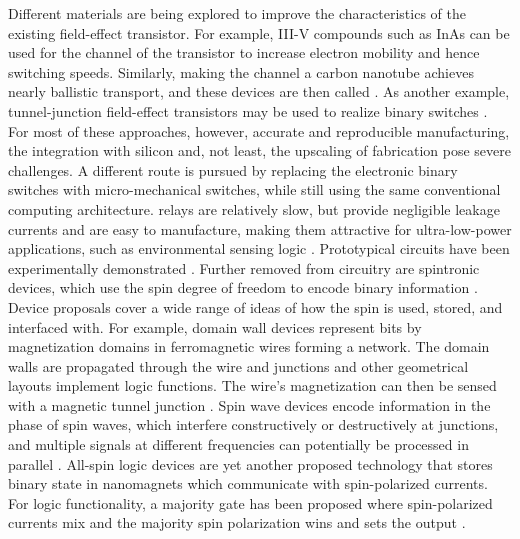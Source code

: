 Different materials are being explored to improve the characteristics of the
existing field-effect transistor. For example, III-V compounds such as InAs can
be used for the channel of the transistor to increase electron mobility and
hence switching speeds. Similarly, making the channel a carbon nanotube achieves
nearly ballistic transport, and these devices are then called .
As another example, tunnel-junction field-effect transistors may be used to
realize binary switches \cite{nikonov2013overview, cavin2012science}. For
most of these approaches, however, accurate and reproducible manufacturing, the
integration with silicon and, not least, the upscaling of fabrication pose
severe challenges. A different route is pursued by replacing the electronic
binary switches with micro-mechanical switches, while still using the same
conventional computing architecture.  relays are relatively slow, but
provide negligible leakage currents and are easy to manufacture, making them
attractive for ultra-low-power applications, such as environmental sensing logic
\cite{kam2011design}. Prototypical  circuits have been experimentally
demonstrated \cite{spencer2011demonstration}. Further removed from 
circuitry are spintronic devices, which use the spin degree of freedom to encode
binary information \cite{wolf2001spintronics}. Device proposals cover a wide
range of ideas of how the spin is used, stored, and interfaced with. For
example, domain wall devices represent bits by magnetization domains in
ferromagnetic wires forming a network. The domain walls are propagated through
the wire and junctions and other geometrical layouts implement logic functions.
The wire's magnetization can then be sensed with a magnetic tunnel junction
\cite{allwood2005magnetic}. Spin wave devices encode information in the phase of
spin waves, which interfere constructively or destructively at junctions, and
multiple signals at different frequencies can potentially be processed in
parallel \cite{khitun2005nano, kostylev2005spin}. All-spin logic devices
are yet another proposed technology that stores binary state in nanomagnets
which communicate with spin-polarized currents. For logic functionality, a
majority gate has been proposed where spin-polarized currents mix and the
majority spin polarization wins and sets the output \cite{behin2010proposal,
srinivasan2011all}. 

